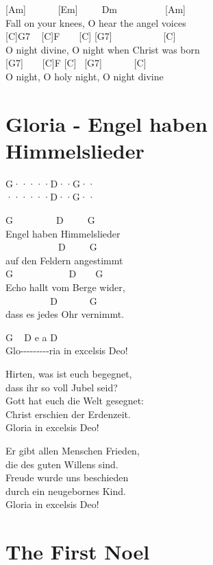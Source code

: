 \documentclass[
  letterpaper,
  twoside=false]{scrbook}
\begin{document}
{[}Am{]} ~ ~ ~ ~{[}Em{]} ~ ~ ~Dm ~ ~ ~ ~ ~ ~{[}Am{]}\\
Fall on your knees, O hear the angel voices\\
{[}C{]}G7 ~ {[}C{]}F ~ ~ {[}C{]} {[}G7{]} ~ ~ ~ ~ ~ ~ {[}C{]}\\
O night divine, O night when Christ was born\\
{[}G7{]} ~ ~ {[}C{]}F {[}C{]} ~{[}G7{]} ~ ~ ~ ~{[}C{]}\\
O night, O holy night, O night divine

\hypertarget{gloria---engel-haben-himmelslieder}{%
\chapter{Gloria - Engel haben
Himmelslieder}\label{gloria---engel-haben-himmelslieder}}

\textbar G·····\textbar D··G··\textbar{}\\
\textbar······\textbar D··G··\textbar{}

G ~ ~ ~ ~ ~ D ~ ~ ~G\\
Engel haben Himmelslieder\\
\hspace*{0.333em} ~ ~ ~ ~ ~ ~ ~D ~ ~ ~G\\
auf den Feldern angestimmt\\
G ~ ~ ~ ~ ~ ~ ~D ~ ~ G\\
Echo hallt vom Berge wider,\\
\hspace*{0.333em} ~ ~ ~ ~ ~ ~D ~ ~ ~ ~G\\
dass es jedes Ohr vernimmt.

G ~ D e a D\\
Glo-\/-\/-\/-\/-\/-\/-\/-\/-ria in excelsis Deo!

Hirten, was ist euch begegnet,\\
dass ihr so voll Jubel seid?\\
Gott hat euch die Welt gesegnet:\\
Christ erschien der Erdenzeit.\\
Gloria in excelsis Deo!

Er gibt allen Menschen Frieden,\\
die des guten Willens sind.\\
Freude wurde uns beschieden\\
durch ein neugebornes Kind.\\
Gloria in excelsis Deo!

\hypertarget{the-first-noel}{%
\chapter{The First Noel}\label{the-first-noel}}
\end{document}
